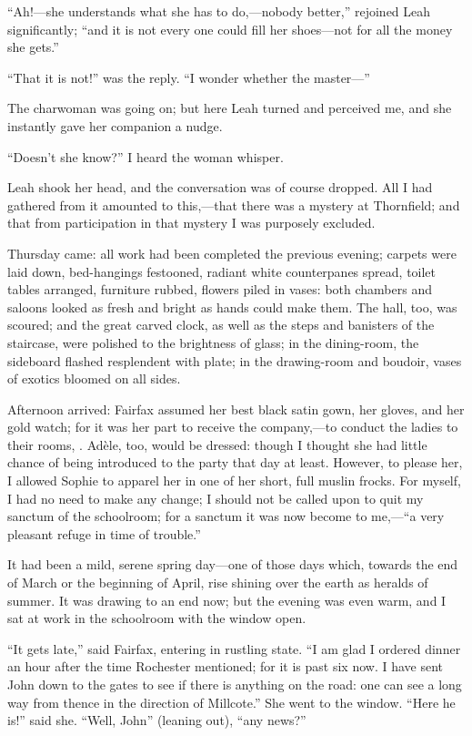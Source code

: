\enquote{Ah!---she understands what she has to do,---nobody better,}
rejoined Leah significantly; \enquote{and it is not every one could fill
	her shoes---not for all the money she gets.}

\enquote{That it is not!} was the reply. \enquote{I wonder whether the
	master---}

The charwoman was going on; but here Leah turned and perceived me, and
she instantly gave her companion a nudge.

\enquote{Doesn't she know?} I heard the woman whisper.

Leah shook her head, and the conversation was of course dropped. All I
had gathered from it amounted to this,---that there was a mystery at
Thornfield; and that from participation in that mystery I was purposely
excluded.

Thursday came: all work had been completed the previous evening; carpets
were laid down, bed-hangings festooned, radiant white counterpanes
spread, toilet tables arranged, furniture rubbed, flowers piled in
vases: both chambers and saloons looked as fresh and bright as hands
could make them. The hall, too, was scoured; and the great carved
clock, as well as the steps and banisters of the staircase, were
polished to the brightness of glass; in the dining-room, the sideboard
flashed resplendent with plate; in the drawing-room and boudoir, vases
of exotics bloomed on all sides.

Afternoon arrived: \Mrs{} Fairfax assumed her best black satin gown, her
gloves, and her gold watch; for it was her part to receive the
company,---to conduct the ladies to their rooms, \etc. Adèle, too, would
be dressed: though I thought she had little chance of being introduced
to the party that day at least. However, to please her, I allowed
Sophie to apparel her in one of her short, full muslin frocks. For
myself, I had no need to make any change; I should not be called upon to
quit my sanctum of the schoolroom; for a sanctum it was now become to
me,---\enquote{a very pleasant refuge in time of trouble.}

It had been a mild, serene spring day---one of those days which, towards
the end of March or the beginning of April, rise shining over the earth
as heralds of summer. It was drawing to an end now; but the evening was
even warm, and I sat at work in the schoolroom with the window open.

\enquote{It gets late,} said \Mrs{} Fairfax, entering in rustling state.
\enquote{I am glad I ordered dinner an hour after the time \Mr{} Rochester
	mentioned; for it is past six now. I have sent John down to the gates
	to see if there is anything on the road: one can see a long way from
	thence in the direction of Millcote.} She went to the window.
\enquote{Here he is!} said she. \enquote{Well, John} (leaning out),
\enquote{any news?}

